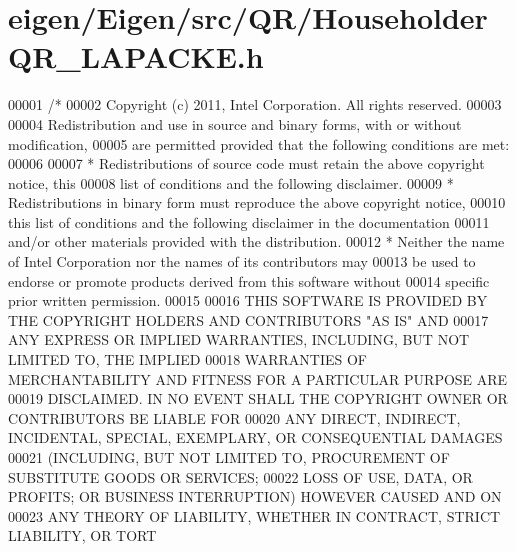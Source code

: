 \hypertarget{eigen_2_eigen_2src_2_q_r_2_householder_q_r___l_a_p_a_c_k_e_8h_source}{}\section{eigen/\+Eigen/src/\+Q\+R/\+Householder\+Q\+R\+\_\+\+L\+A\+P\+A\+C\+KE.h}
\label{eigen_2_eigen_2src_2_q_r_2_householder_q_r___l_a_p_a_c_k_e_8h_source}

\begin{DoxyCode}
00001 \textcolor{comment}{/*}
00002 \textcolor{comment}{ Copyright (c) 2011, Intel Corporation. All rights reserved.}
00003 \textcolor{comment}{}
00004 \textcolor{comment}{ Redistribution and use in source and binary forms, with or without modification,}
00005 \textcolor{comment}{ are permitted provided that the following conditions are met:}
00006 \textcolor{comment}{}
00007 \textcolor{comment}{ * Redistributions of source code must retain the above copyright notice, this}
00008 \textcolor{comment}{   list of conditions and the following disclaimer.}
00009 \textcolor{comment}{ * Redistributions in binary form must reproduce the above copyright notice,}
00010 \textcolor{comment}{   this list of conditions and the following disclaimer in the documentation}
00011 \textcolor{comment}{   and/or other materials provided with the distribution.}
00012 \textcolor{comment}{ * Neither the name of Intel Corporation nor the names of its contributors may}
00013 \textcolor{comment}{   be used to endorse or promote products derived from this software without}
00014 \textcolor{comment}{   specific prior written permission.}
00015 \textcolor{comment}{}
00016 \textcolor{comment}{ THIS SOFTWARE IS PROVIDED BY THE COPYRIGHT HOLDERS AND CONTRIBUTORS "AS IS" AND}
00017 \textcolor{comment}{ ANY EXPRESS OR IMPLIED WARRANTIES, INCLUDING, BUT NOT LIMITED TO, THE IMPLIED}
00018 \textcolor{comment}{ WARRANTIES OF MERCHANTABILITY AND FITNESS FOR A PARTICULAR PURPOSE ARE}
00019 \textcolor{comment}{ DISCLAIMED. IN NO EVENT SHALL THE COPYRIGHT OWNER OR CONTRIBUTORS BE LIABLE FOR}
00020 \textcolor{comment}{ ANY DIRECT, INDIRECT, INCIDENTAL, SPECIAL, EXEMPLARY, OR CONSEQUENTIAL DAMAGES}
00021 \textcolor{comment}{ (INCLUDING, BUT NOT LIMITED TO, PROCUREMENT OF SUBSTITUTE GOODS OR SERVICES;}
00022 \textcolor{comment}{ LOSS OF USE, DATA, OR PROFITS; OR BUSINESS INTERRUPTION) HOWEVER CAUSED AND ON}
00023 \textcolor{comment}{ ANY THEORY OF LIABILITY, WHETHER IN CONTRACT, STRICT LIABILITY, OR TORT}

\end{DoxyCode}
